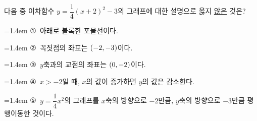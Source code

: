 다음 중 이차함수 $y=\dfrac{1}{4}(x+2)^2-3$의 그래프에 대한 설명으로 옳지 \underline{않은} 것은?
\par\medskip\par\noindent\hangindent=1.4em {\small ①}\ 아래로 볼록한 포물선이다.\par\noindent\hangindent=1.4em {\small ②}\ 꼭짓점의 좌표는 $(-2{,}\mkern3mu\mathopen{}-3)$이다.\par\noindent\hangindent=1.4em {\small ③}\ $y$축과의 교점의 좌표는 $(0{,}\mkern3mu\mathopen{}-2)$이다.\par\noindent\hangindent=1.4em {\small ④}\ $x>-2$일 때, $x$의 값이 증가하면 $y$의 값은 감소한다.\par\noindent\hangindent=1.4em {\small ⑤}\ $y=\dfrac{1}{4}x^2$의 그래프를 $x$축의 방향으로 $-2$만큼, $y$축의 방향으로 $-3$만큼 평행이동한 것이다.\par\medskip
